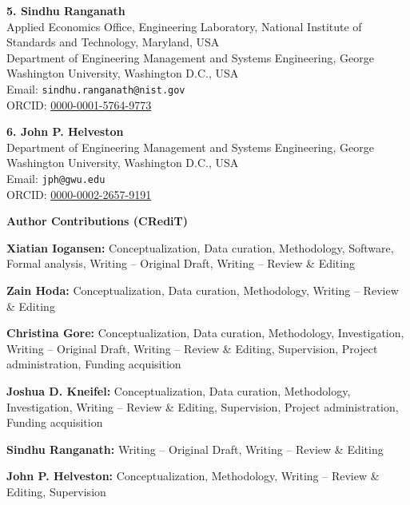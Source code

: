 \documentclass[a4paper,12pt]{article}
\begin{document}
\vspace{1em}

\noindent\textbf{5. Sindhu Ranganath}\\
Applied Economics Office, Engineering Laboratory, National Institute of Standards and Technology, Maryland, USA\\
Department of Engineering Management and Systems Engineering, George Washington University, Washington D.C., USA\\
Email: \texttt{sindhu.ranganath@nist.gov}\\
ORCID: \href{https://orcid.org/0000-0001-5764-9773}{0000-0001-5764-9773}

\vspace{1em}

\noindent\textbf{6. John P. Helveston}\\
Department of Engineering Management and Systems Engineering, George Washington University, Washington D.C., USA\\
Email: \texttt{jph@gwu.edu}\\
ORCID: \href{https://orcid.org/0000-0002-2657-9191}{0000-0002-2657-9191}

\vspace{3em}

{\LARGE\bfseries Author Contributions (CRediT)}

\vspace{1em}

\noindent\textbf{Xiatian Iogansen:} Conceptualization, Data curation, Methodology, Software, Formal analysis, Writing -- Original Draft, Writing -- Review \& Editing

\noindent\textbf{Zain Hoda:} Conceptualization, Data curation, Methodology, Writing -- Review \& Editing

\noindent\textbf{Christina Gore:} Conceptualization, Data curation, Methodology, Investigation, Writing -- Original Draft, Writing -- Review \& Editing, Supervision, Project administration, Funding acquisition

\noindent\textbf{Joshua D. Kneifel:} Conceptualization, Data curation, Methodology, Investigation, Writing -- Review \& Editing, Supervision, Project administration, Funding acquisition

\noindent\textbf{Sindhu Ranganath:} Writing -- Original Draft, Writing -- Review \& Editing

\noindent\textbf{John P. Helveston:} Conceptualization, Methodology, Writing -- Review \& Editing, Supervision
\end{document}
